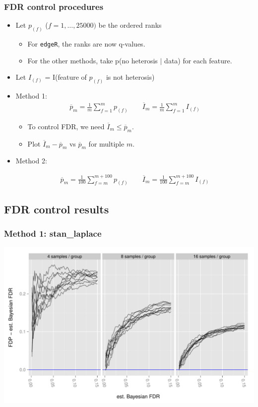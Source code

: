 \documentclass[handout]{beamer}
\providecommand{\ov}[1]{\overline{#1}}
\numberwithin{equation}{section}
\begin{document}
\begin{frame}
\frametitle{FDR control procedures}

\begin{itemize}
\item Let $p_{(f)}$ ($f = 1, \ldots, 25000)$ be the ordered ranks 
\begin{itemize}
\item For {\tt edgeR}, the ranks are now q-values.
\item For the other methods, take p(no heterosis $|$ data) for each feature.
\end{itemize}
\pause \item Let $I_{(f)}$ = I(feature of $p_{(f)}$ is not heterosis)
\item Method 1:
\begin{align*}
\ov{p}_m = \frac{1}{m} \sum_{f = 1}^m p_{(f)} \qquad \ov{I}_m = \frac{1}{m}\sum_{f = 1}^m I_{(f)}
\end{align*}
\begin{itemize}
\pause \item To control FDR, we need $\ov{I}_m \le \ov{p}_m$.
\item Plot $\ov{I}_m - \ov{p}_m$ vs $\ov{p}_m$ for multiple $m$.
\end{itemize}

\pause \item Method 2:

\begin{align*}
\ov{p}_m = \frac{1}{100} \sum_{f = m}^{m + 100} p_{(f)} \qquad \ov{I}_m = \frac{1}{100}\sum_{f = m}^{m + 100} I_{(f)}
\end{align*}
\end{itemize}
\end{frame}

\subsection{FDR control results}


\begin{frame}
\frametitle{Method 1: stan\_laplace}
\begin{center}
\includegraphics[scale=0.5]{fdr-method1-stan1}
\end{center}
\end{frame}
\end{document}
